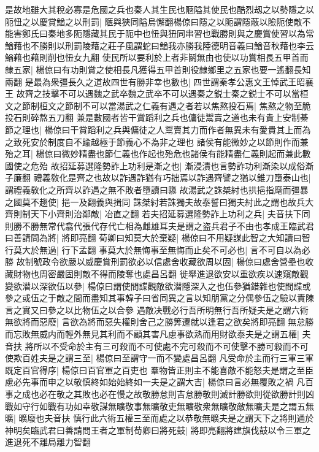 是故地雖大其稅必寡是危國之兵也秦人其生民也陿隘其使民也酷烈刼之以勢隱之以阨忸之以慶賞鰌之以刑罰|{
	陿與狹同隘烏懈翻楊倞曰隱之以阨謂隱蔽以險阨使敵不能害鄭氏曰秦地多阨隱藏其民于阨中也忸與狃同串習也戰勝則與之慶賞使習以為常鰌藉也不勝則以刑罰陵藉之莊子風謂蛇曰鰌我亦勝我陸德明音義曰鰌音秋藉也李云鰌藉也藉則削也忸女九翻}
使民所以要利於上者非鬬無由也使以功賞相長五甲首而隸五家|{
	楊倞曰有功則賞之使相長凡獲得五甲首則役隷鄉里之五家也要一遙翻長知兩翻}
是最為衆彊長久之道故四世有勝非幸也數也|{
	四世謂秦孝公惠文王悼武王昭襄王}
故齊之技擊不可以遇魏之武卒魏之武卒不可以遇秦之鋭士秦之鋭士不可以當桓文之節制桓文之節制不可以當湯武之仁義有遇之者若以焦熬投石焉|{
	焦熬之物至脆投石則碎熬五刀翻}
兼是數國者皆干賞蹈利之兵也傭徒鬻賣之道也未有貴上安制綦節之理也|{
	楊倞曰干賞蹈利之兵與傭徒之人鬻賣其力而作者無異未有愛貴其上而為之致死安於制度自不踰越極于節義心不為非之理也}
諸侯有能微妙之以節則作而兼殆之耳|{
	楊倞曰微妙精盡也節仁義也作起也殆危也諸侯有能精盡仁義則起而兼此數國使之危殆}
故招延募選隆勢詐上功利是漸之也|{
	漸浸漬也言勢詐功利漸染以成俗漸子廉翻}
禮義敎化是齊之也故以詐遇詐猶有巧拙焉以詐遇齊譬之猶以錐刀墮泰山也|{
	謂禮義敎化之所齊以詐遇之無不敗者墮讀曰隳}
故湯武之誅桀紂也拱挹指麾而彊暴之國莫不趨使|{
	挹一及翻義與揖同}
誅桀紂若誅獨夫故泰誓曰獨夫紂此之謂也故兵大齊則制天下小齊則治鄰敵|{
	冶直之翻}
若夫招延募選隆勢詐上功利之兵|{
	夫音扶下同}
則勝不勝無常代翕代張代存代亡相為雌雄耳夫是謂之盗兵君子不由也孝成王臨武君曰善請問為將|{
	將即亮翻}
荀卿曰知莫大於棄疑|{
	楊倞曰不用疑謀此智之大知讀曰智}
行莫大於無過|{
	行下孟翻}
事莫大於無悔事至無悔而止矣不可必也|{
	言不可自以為必勝}
故制號政令欲嚴以威慶賞刑罰欲必以信處舍收藏欲周以固|{
	楊倞曰處舍營壘也收藏財物也周密嚴固則敵不得而陵奪也處昌呂翻}
徙舉進退欲安以重欲疾以速窺敵觀變欲潜以深欲伍以參|{
	楊倞曰謂使間諜觀敵欲潜隱深入之也伍參猶錯雜也使間諜或參之或伍之于敵之間而盡知其事韓子曰省同異之言以知朋黨之分偶參伍之驗以責陳言之實又曰參之以比物伍之以合參}
遇敵决戰必行吾所明無行吾所疑夫是之謂六術無欲將而惡廢|{
	言欲為將而惡失權則舍己之勝筭遷就以逢君之欲矣將即亮翻}
無怠勝而忘敗無威内而輕外無見其利而不顧其害凡慮事欲熟而用財欲泰夫是之謂五權|{
	夫音扶}
將所以不受命於主有三可殺而不可使處不完可殺而不可使擊不勝可殺而不可使欺百姓夫是之謂三至|{
	楊倞曰至謂守一而不變處昌呂翻}
凡受命於主而行三軍三軍既定百官得序|{
	楊倞曰百官軍之百吏也}
羣物皆正則主不能喜敵不能怒夫是謂之至臣慮必先事而申之以敬慎終如始始終如一夫是之謂大吉|{
	楊倞曰言必無覆敗之禍}
凡百事之成也必在敬之其敗也必在慢之故敬勝怠則吉怠勝敬則滅計勝欲則從欲勝計則凶戰如守行如戰有功如幸敬謀無曠敬事無曠敬吏無曠敬衆無曠敬敵無曠夫是之謂五無曠|{
	曠廢也夫音扶}
慎行此六術五權三至而處之以恭敬無曠夫是之謂天下之將則通於神明矣臨武君曰善請問王者之軍制荀卿曰將死鼓|{
	將即亮翻將建旗伐鼓以令三軍之進退死不離局離力智翻}
